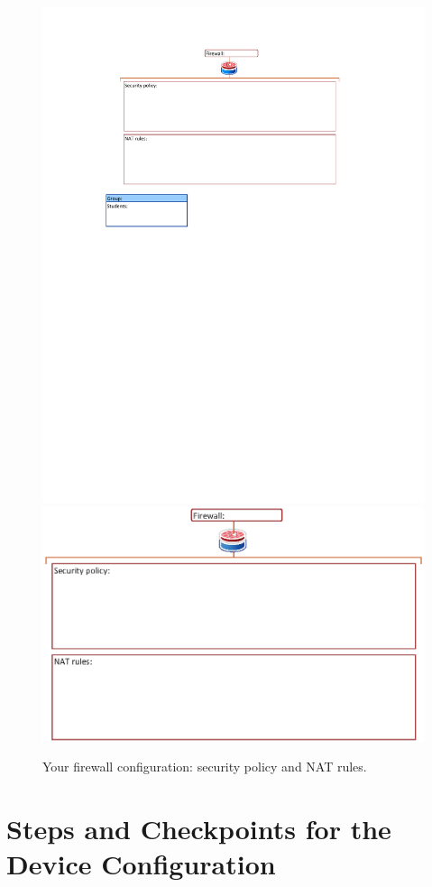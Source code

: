 \begin{figure}
\centering
\ifpdf
\includegraphics[width=0.9\linewidth]{Figures/FinalFirewall.pdf}
\else
\includegraphics[width=0.9\linewidth]{Figures/FinalFirewall.eps}
\fi
\caption{Your firewall configuration: security policy and NAT rules.}
\label{fig:FinalFirewall}
\end{figure}


\section{Steps and Checkpoints for the Device Configuration}

